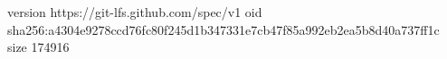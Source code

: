 version https://git-lfs.github.com/spec/v1
oid sha256:a4304e9278ccd76fc80f245d1b347331e7cb47f85a992eb2ea5b8d40a737ff1c
size 174916

